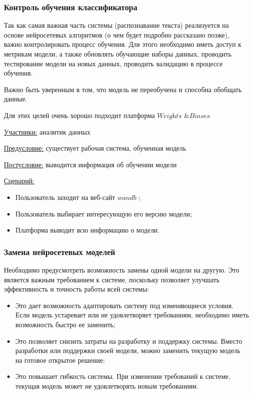 \subsubsection{Контроль обучения классификатора}

Так как самая важная часть системы (распознавание текста) реализуется на основе нейросетевых алгоритмов (о чем будет подробно рассказано позже), важно контролировать процесс обучения.
Для этого необходимо иметь доступ к метрикам модели, а также обновлять обучающие наборы данных, проводить тестирование модели на новых данных, проводить валидацию в процессе обучения.

Важно быть уверенным в том, что модель не переобучена и способна обобщать данные.

Для этих целей очень хорошо подходит платформа $\textit{Weights \& Biases}$ \cite{wandb}

\underline{Участники:} аналитик данных

\underline{Предусловие:} существует рабочая система, обученная модель

\underline{Постусловие:} выводится информация об обучении модели

\underline{Сценарий:}

\begin{itemize}
    \item Пользователь заходит на веб-сайт $wandb$ \cite{wandb};
    \item Пользователь выбирает интересующую его версию модели; 
    \item Платформа выводит всю информацию о модели.
\end{itemize}

\subsubsection{Замена нейросетевых моделей}

Необходимо предусмотреть возможность замены одной модели на другую. Это является важным требованием к системе, поскольку позволяет улучшать эффективность и точность работы всей системы:
\begin{itemize}
    \item Это дает возможность адаптировать систему под изменяющиеся условия. Если модель устаревает или не удовлетворяет требованиям, необходимо иметь возможность быстро ее заменить;
    \item Это позволяет снизить затраты на разработку и поддержку системы. Вместо разработки или поддержки своей модели, можно заменить текущую модель на готовое открытое решение;
    \item Это повышает гибкость системы. При изменении требований к системе, текущая модель может не удовлетворять новым требованиям.
\end{itemize}

